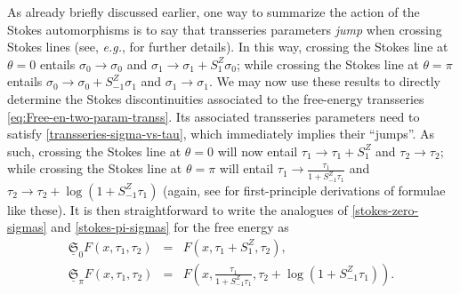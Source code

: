 \documentclass[11pt,a4paper]{article}
\begin{document}
%
\noindent
As already briefly discussed earlier, one way to summarize the action of the Stokes automorphisms is to say that transseries parameters \textit{jump} when crossing Stokes lines (see, \textit{e.g.}, \cite{as13} for further details). In this way, crossing the Stokes line at $\theta = 0$ entails $\sigma_0 \to \sigma_0$ and $\sigma_1 \to \sigma_{1} + S_{1}^{Z} \sigma_{0}$; while crossing the Stokes line at $\theta = \pi$ entails $\sigma_0 \to \sigma_{0} + S_{-1}^{Z} \sigma_{1}$ and $\sigma_1 \to \sigma_1$. We may now use these results to directly determine the Stokes discontinuities associated to the free-energy transseries \eqref{eq:Free-en-two-param-transs}. Its associated transseries parameters need to satisfy \eqref{transseries-sigma-vs-tau}, which immediately implies their ``jumps''. As such, crossing the Stokes line at $\theta = 0$ will now entail $\tau_1 \to \tau_1 + S_{1}^{Z}$ and $\tau_2 \to \tau_2$; while crossing the Stokes line at $\theta = \pi$ will entail $\tau_1 \to \frac{\tau_1}{1 + S_{-1}^{Z} \tau_1}$ and $\tau_2 \to \tau_2 + \log \left( 1 + S_{-1}^{Z} \tau_1 \right)$ (again, see \cite{as13} for first-principle derivations of formulae like these). It is then straightforward to write the analogues of \eqref{stokes-zero-sigmas} and \eqref{stokes-pi-sigmas} for the free energy as
%
\begin{eqnarray}
\label{eq:Stokes-aut-zero-v1}
\underline{\mathfrak{S}}_{0} F (x, \tau_1, \tau_2) &=& F \left(x, \tau_1+S_{1}^{Z}, \tau_{2}\right), \\
\label{eq:Stokes-aut-pi-v1}
\underline{\mathfrak{S}}_{\pi} F (x, \tau_1, \tau_2) &=& F \left(x, \frac{\tau_1}{1 + S_{-1}^{Z} \tau_{1}}, \tau_{2} + \log \left( 1 + S_{-1}^{Z} \tau_{1} \right) \right).
\end{eqnarray}
\end{document}
